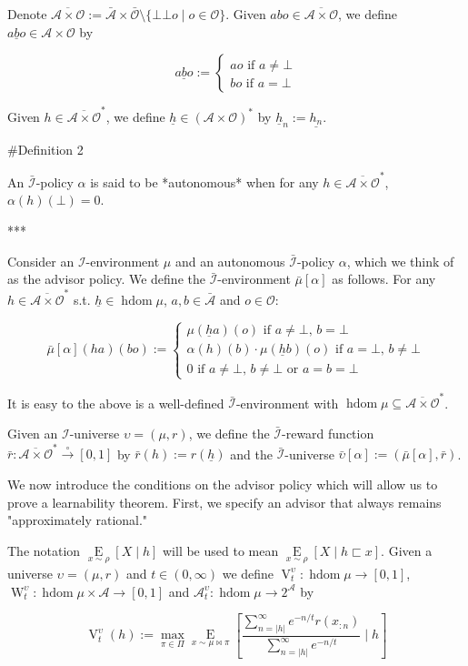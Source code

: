 \documentclass[a4paper]{article}
\newcommand{\E}[1]{\underset{#1}{\operatorname{E}}}
\newcommand{\Abs}[1]{\lvert #1 \rvert}
\newcommand{\PF}{\xrightarrow{\circ}}
\newcommand{\Ob}{\mathcal{O}}
\newcommand{\A}{\mathcal{A}}
\newcommand{\I}{\mathcal{I}}
\newcommand{\FH}{(\A \times \Ob)^*}
\newcommand{\Ado}{\bar{\Ob}}
\newcommand{\Ada}{\bar{\A}}
\newcommand{\Adi}{\bar{\I}}
\newcommand{\Adao}{\overline{\A \times \Ob}}
\newcommand{\Adfh}{\Adao^*}
\DeclareMathOperator{\HD}{hdom}
\newcommand{\V}{\operatorname{V}}
\newcommand{\W}{\operatorname{W}}
\begin{document}
Denote $\Adao:= \Ada \times \Ado \setminus \{\bot\bot o \mid o \in \Ob\}$. Given $abo \in \Adao$, we define $\underline{abo} \in \A \times \Ob$ by

$$\underline{abo}:=\begin{cases} ao \text{ if } a\ne\bot \\ bo \text{ if } a=\bot \end{cases}$$

Given $h \in \Adfh$, we define $\underline{h} \in \FH$ by $\underline{h}_n:=\underline{h_n}$. 

\#Definition 2

An $\Adi$-policy $\alpha$ is said to be *autonomous* when for any $h \in \Adfh$, $\alpha(h)(\bot)=0$.

***

Consider an $\I$-environment $\mu$ and an autonomous $\Adi$-policy $\alpha$, which we think of as the advisor policy. We define the $\Adi$-environment $\bar{\mu}[\alpha]$ as follows. For any $h \in \Adfh$ s.t. $\underline{h} \in \HD \mu$, $a,b \in \Ada$ and $o \in \Ob$:

$$\bar{\mu}[\alpha](ha)(bo):=\begin{cases} \mu(\underline{h}a)(o) \text{ if } a\ne\bot,\, b=\bot \\ \alpha(h)(b)\cdot\mu(\underline{h}b)(o) \text{ if } a=\bot,\,b\ne\bot \\ 0 \text{ if } a\ne\bot,\, b\ne\bot \text{ or } a=b=\bot \end{cases}$$

It is easy to the above is a well-defined $\Adi$-environment with $\HD \mu \subseteq \Adfh$. 

Given an $\I$-universe $\upsilon=(\mu,r)$, we define the $\Adi$-reward function $\bar{r}: \Adfh \PF [0,1]$ by $\bar{r}(h):=r(\underline{h})$ and the $\Adi$-universe $\bar{\upsilon}[\alpha]:=(\bar{\mu}[\alpha],\bar{r})$.

We now introduce the conditions on the advisor policy which will allow us to prove a learnability theorem. First, we specify an advisor that always remains "approximately rational."

The notation $\E{x \sim \rho}[X \mid h]$ will be used to mean $\E{x \sim \rho}[X \mid h \sqsubset x]$. Given a universe $\upsilon=(\mu,r)$ and $t \in (0, \infty)$ we define $\V_t^\upsilon: \HD{\mu} \rightarrow [0,1]$, $\W_t^\upsilon: \HD{\mu} \times \A \rightarrow [0,1]$ and $\A^\upsilon_t: \HD{\mu} \rightarrow 2^\A$ by

$$\V_t^\upsilon(h):=\max_{\pi \in \Pi} {\E{x \sim \mu\bowtie\pi}[\frac{\sum_{n=\Abs{h}}^\infty e^{-n/t} r(x_{:n})}{\sum_{n=\Abs{h}}^\infty e^{-n/t}} \mid h]}$$
\end{document}

